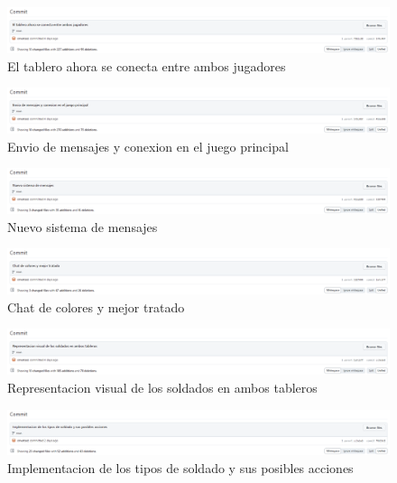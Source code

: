 \documentclass{article}
\begin{document}
\begin{figure}[H]
	\centering
	\includegraphics[width=1\textwidth,keepaspectratio]{img/commit_18.png}
	\caption{El tablero ahora se conecta entre ambos jugadores}
\end{figure}
\begin{figure}[H]
	\centering
	\includegraphics[width=1\textwidth,keepaspectratio]{img/commit_19.png}
	\caption{Envio de mensajes y conexion en el juego principal}
\end{figure}
\begin{figure}[H]
	\centering
	\includegraphics[width=1\textwidth,keepaspectratio]{img/commit_20.png}
	\caption{Nuevo sistema de mensajes}
\end{figure}
\begin{figure}[H]
	\centering
	\includegraphics[width=1\textwidth,keepaspectratio]{img/commit_21.png}
	\caption{Chat de colores y mejor tratado}
\end{figure}
\begin{figure}[H]
	\centering
	\includegraphics[width=1\textwidth,keepaspectratio]{img/commit_22.png}
	\caption{Representacion visual de los soldados en ambos tableros}
\end{figure}
\begin{figure}[H]
	\centering
	\includegraphics[width=1\textwidth,keepaspectratio]{img/commit_23.png}
	\caption{Implementacion de los tipos de soldado y sus posibles acciones}
\end{figure}
\end{document}
